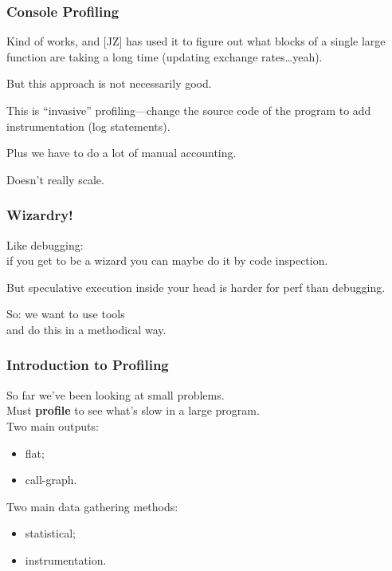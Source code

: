 \begin{frame}
\frametitle{Console Profiling}

\Large
\begin{changemargin}{1cm}
Kind of works, and [JZ] has used it to figure out what blocks of a single large function are taking a long time (updating exchange rates\ldots yeah). 

But this approach is not necessarily good.  

This is ``invasive'' profiling---change the source code of the program to add instrumentation (log statements). 

Plus we have to do a lot of manual accounting.

Doesn't really scale.
\end{changemargin}

\end{frame}



\begin{frame}
\frametitle{Wizardry!}

\Large
\begin{changemargin}{2cm}
Like debugging:\\
\qquad if you get to be a wizard you can maybe do it by code inspection.

But speculative execution inside your head is harder for perf than debugging.

So: we want to use tools \\ 
and do this in a methodical way.
\end{changemargin}

\end{frame}


\begin{frame}
  \frametitle{Introduction to Profiling}


\Large
\begin{changemargin}{1.5cm}
    So far we've been looking at small problems.\\[1em]
    Must {\bf profile} to see what's slow in a
      large program.\\[1em]
    Two main outputs:
      \begin{itemize}
        \item flat;
        \item call-graph.
      \end{itemize}



    Two main data gathering methods:
      \begin{itemize}
        \item statistical;
        \item instrumentation.
      \end{itemize}
   \end{changemargin}
\end{frame}

